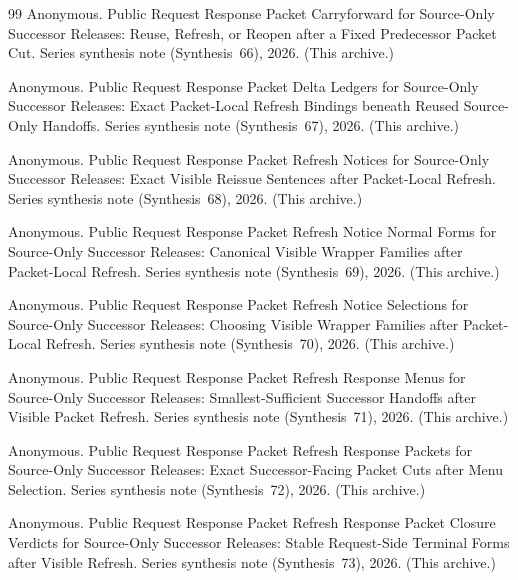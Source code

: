 \documentclass[11pt]{article}
\begin{document}
\begin{thebibliography}{99}
Anonymous.
\newblock Public Request Response Packet Carryforward for Source-Only Successor Releases: Reuse, Refresh, or Reopen after a Fixed Predecessor Packet Cut.
\newblock Series synthesis note (Synthesis~66), 2026. (This archive.)

Anonymous.
\newblock Public Request Response Packet Delta Ledgers for Source-Only Successor Releases: Exact Packet-Local Refresh Bindings beneath Reused Source-Only Handoffs.
\newblock Series synthesis note (Synthesis~67), 2026. (This archive.)

Anonymous.
\newblock Public Request Response Packet Refresh Notices for Source-Only Successor Releases: Exact Visible Reissue Sentences after Packet-Local Refresh.
\newblock Series synthesis note (Synthesis~68), 2026. (This archive.)

Anonymous.
\newblock Public Request Response Packet Refresh Notice Normal Forms for Source-Only Successor Releases: Canonical Visible Wrapper Families after Packet-Local Refresh.
\newblock Series synthesis note (Synthesis~69), 2026. (This archive.)

Anonymous.
\newblock Public Request Response Packet Refresh Notice Selections for Source-Only Successor Releases: Choosing Visible Wrapper Families after Packet-Local Refresh.
\newblock Series synthesis note (Synthesis~70), 2026. (This archive.)

Anonymous.
\newblock Public Request Response Packet Refresh Response Menus for Source-Only Successor Releases: Smallest-Sufficient Successor Handoffs after Visible Packet Refresh.
\newblock Series synthesis note (Synthesis~71), 2026. (This archive.)

Anonymous.
\newblock Public Request Response Packet Refresh Response Packets for Source-Only Successor Releases: Exact Successor-Facing Packet Cuts after Menu Selection.
\newblock Series synthesis note (Synthesis~72), 2026. (This archive.)

Anonymous.
\newblock Public Request Response Packet Refresh Response Packet Closure Verdicts for Source-Only Successor Releases: Stable Request-Side Terminal Forms after Visible Refresh.
\newblock Series synthesis note (Synthesis~73), 2026. (This archive.)


\end{thebibliography}
\end{document}

